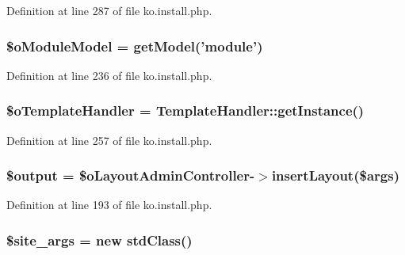 Definition at line 287 of file ko.\-install.\-php.

\hypertarget{ko_8install_8php_a8d7a87df524e7d6938f66f8e284cdd1e}{
\subsubsection[{\$o\-Module\-Model}]{\setlength{\rightskip}{0pt plus 5cm}\$o\-Module\-Model = {\bf get\-Model}('{\bf module}')}}\label{ko_8install_8php_a8d7a87df524e7d6938f66f8e284cdd1e}


Definition at line 236 of file ko.\-install.\-php.

\hypertarget{ko_8install_8php_abd57e3ab220291ea9b5c16c2a4e0670e}{
\subsubsection[{\$o\-Template\-Handler}]{\setlength{\rightskip}{0pt plus 5cm}\$o\-Template\-Handler = {\bf Template\-Handler\-::get\-Instance}()}}\label{ko_8install_8php_abd57e3ab220291ea9b5c16c2a4e0670e}


Definition at line 257 of file ko.\-install.\-php.

\hypertarget{ko_8install_8php_a73004ce9cd673c1bfafd1dc351134797}{
\subsubsection[{\$output}]{\setlength{\rightskip}{0pt plus 5cm}\$output = \$o\-Layout\-Admin\-Controller-\/$>$insert\-Layout(\$args)}}\label{ko_8install_8php_a73004ce9cd673c1bfafd1dc351134797}


Definition at line 193 of file ko.\-install.\-php.

\hypertarget{ko_8install_8php_a19e0fcfacd69155c9cc255e5500f6ccc}{
\subsubsection[{\$site\-\_\-args}]{\setlength{\rightskip}{0pt plus 5cm}\$site\-\_\-args = new std\-Class()}}\label{ko_8install_8php_a19e0fcfacd69155c9cc255e5500f6ccc}


